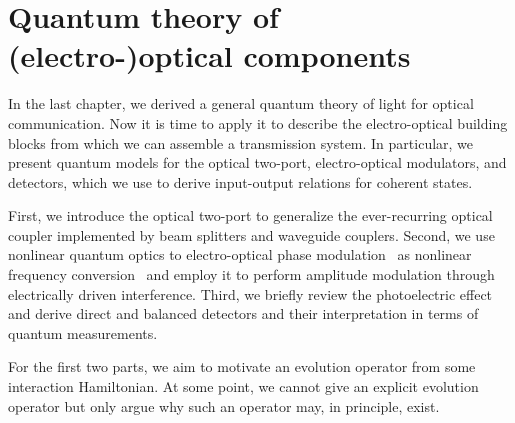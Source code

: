 \chapter{Quantum theory of (electro-)optical components}\label{ch:components}

In the last chapter, we derived a general quantum theory of light for optical communication.
Now it is time to apply it to describe the electro-optical building blocks from which we can assemble a transmission system.
In particular, we present quantum models for the optical two-port, electro-optical modulators, and detectors, which we use to derive input-output relations for coherent states.

First, we introduce the optical two-port to generalize the ever-recurring optical coupler implemented by beam splitters and waveguide couplers.
Second, we use nonlinear quantum optics to electro-optical phase modulation~\cite{Horoshko2018} as nonlinear frequency conversion~\cite{QuesadaMejia2015} and employ it to perform amplitude modulation through electrically driven interference.
Third, we briefly review the photoelectric effect~\cite{Mandel1995,Vogel2006} and derive direct and balanced detectors and their interpretation in terms of quantum measurements.

For the first two parts, we aim to motivate an evolution operator from some interaction Hamiltonian. 
At some point, we cannot give an explicit evolution operator but only argue why such an operator may, in principle, exist.